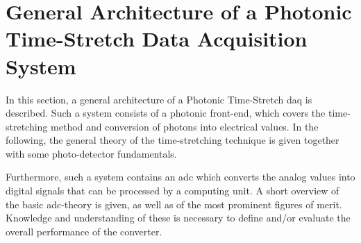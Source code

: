 %
%
%
%
%
\section{General Architecture of a Photonic Time-Stretch Data Acquisition System}
In this section, a general architecture of a Photonic Time-Stretch \gls{daq} is described.
Such a system consists of a photonic front-end, which covers the time-stretching method and conversion of photons into electrical values. %
In the following, the general theory of the time-stretching technique is given together with some photo-detector fundamentals. 

Furthermore, such a system contains an \gls{adc} which converts the analog values into digital signals that can be processed by a computing unit. A short overview of the basic \gls{adc}-theory is given, as well as of the most prominent figures of merit. Knowledge and understanding of these is necessary to define and/or evaluate the overall performance of the converter. 

